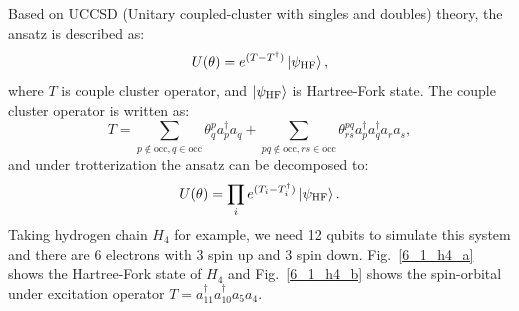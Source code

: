 Based on UCCSD (Unitary coupled-cluster with singles and doubles) theory, the ansatz is described as:
\begin{equation}
    U(\theta) = e^{(T-T^\dagger)}\ket{\psi_\text{HF}},
\end{equation}
where $T$ is couple cluster operator, and $\ket{\psi_\text{HF}}$ is Hartree-Fork state. The couple cluster operator is written as:
\begin{equation}
    T=\sum_{p\notin\text{occ},q\in\text{occ}}\theta_q^p a_p^\dagger a_q + \sum_{pq\notin\text{occ},rs\in\text{occ}}\theta_{rs}^{pq}a_p^\dagger a_q^\dagger a_r a_s,
\end{equation}
and under trotterization the ansatz can be decomposed to:
\begin{equation}
    U(\theta)=\prod_ie^{(T_i-T_i^\dagger)}\ket{\psi_\text{HF}}.
\end{equation}
Taking hydrogen chain $H_4$ for example, we need 12 qubits to simulate this system and there are 6 electrons with 3 spin up and 3 spin down. Fig.~\ref{6_1_h4_a} shows the Hartree-Fork state of $H_4$ and Fig.~\ref{6_1_h4_b} shows the spin-orbital under excitation operator $T=a_{11}^\dagger a_{10}^\dagger a_5 a_4$.
